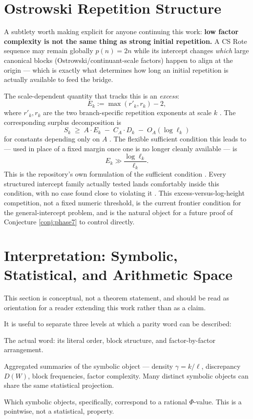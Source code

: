 \documentclass[11pt]{article}
\begin{document}
\section{Ostrowski Repetition Structure}
\label{sec:ostrowski}

A subtlety worth making explicit for anyone continuing this work: \textbf{low factor complexity is not the same thing as strong initial repetition.} A CS Rote sequence may remain globally $p(n)=2n$ while its intercept changes \emph{which} large canonical blocks (Ostrowski/continuant-scale factors) happen to align at the origin --- which is exactly what determines how long an initial repetition is actually available to feed the bridge.

The scale-dependent quantity that tracks this is an \emph{excess}:
\[
E_k := \max(r'_k, r_k) - 2,
\]
where $r'_k,r_k$ are the two branch-specific repetition exponents at scale $k$ \cite{Phase7Surplus}. The corresponding surplus decomposition is
\[
S_k \;\ge\; A\cdot E_k \;-\; C_A\cdot D_k \;-\; O_A(\log \ell_k)
\]
for constants depending only on $A$ \cite{Phase7Surplus}. The flexible sufficient condition this leads to --- used in place of a fixed margin once one is no longer cleanly available --- is
\[
E_k \gg \frac{\log \ell_k}{\ell_k}.
\]
This is the repository's own formulation of the sufficient condition \cite{Phase7Flexible}.
Every structured intercept family actually tested lands comfortably inside this condition, with no case found close to violating it \cite{Phase7Structured}. This excess-versus-log-height competition, not a fixed numeric threshold, is the current frontier condition for the general-intercept problem, and is the natural object for a future proof of Conjecture \ref{conj:phase7} to control directly.

\section{Interpretation: Symbolic, Statistical, and Arithmetic Space}
\label{sec:interpretation}

This section is conceptual, not a theorem statement, and should be read as orientation for a reader extending this work rather than as a claim.

It is useful to separate three levels at which a parity word can be described:

\begin{description}[leftmargin=2em]
\item[Symbolic space.] The actual word: its literal order, block structure, and factor-by-factor arrangement.
\item[Statistical projection.] Aggregated summaries of the symbolic object --- density $\gamma=k/\ell$, discrepancy $D(W)$, block frequencies, factor complexity. Many distinct symbolic objects can share the same statistical projection.
\item[Arithmetic admissibility.] Which symbolic objects, specifically, correspond to a rational $\Phi$-value. This is a pointwise, not a statistical, property.
\end{description}
\end{document}
